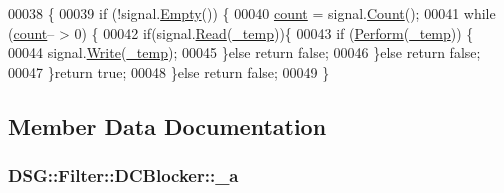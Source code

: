 \begin{DoxyCode}
00038                                                                     \{
00039             \textcolor{keywordflow}{if} (!signal.\hyperlink{class_d_s_g_1_1_ring_buffer_ac1346f5842d08b988a5297abe4089b96}{Empty}()) \{
00040                 \hyperlink{class_d_s_g_1_1_filter_1_1_d_c_blocker_a2a045707b5b79e7a4330c87156f7b344}{count} = signal.\hyperlink{class_d_s_g_1_1_ring_buffer_a9bd79b0a6dff618b205e396c101ee070}{Count}();
00041                 \textcolor{keywordflow}{while} (\hyperlink{class_d_s_g_1_1_filter_1_1_d_c_blocker_a2a045707b5b79e7a4330c87156f7b344}{count}-- > 0) \{
00042                     \textcolor{keywordflow}{if}(signal.\hyperlink{class_d_s_g_1_1_ring_buffer_a6b2848a64f15c7b0c320779582fa0fbe}{Read}(\hyperlink{class_d_s_g_1_1_filter_1_1_d_c_blocker_a4a698e11be27e8613f5b5146df9c4599}{\_temp}))\{
00043                         \textcolor{keywordflow}{if} (\hyperlink{class_d_s_g_1_1_filter_1_1_d_c_blocker_a9757794b5f9b7789132e5eaa44e07cef}{Perform}(\hyperlink{class_d_s_g_1_1_filter_1_1_d_c_blocker_a4a698e11be27e8613f5b5146df9c4599}{\_temp})) \{
00044                             signal.\hyperlink{class_d_s_g_1_1_ring_buffer_aa5dd2caa0a270173251faee40a43d692}{Write}(\hyperlink{class_d_s_g_1_1_filter_1_1_d_c_blocker_a4a698e11be27e8613f5b5146df9c4599}{\_temp});
00045                         \}\textcolor{keywordflow}{else} \textcolor{keywordflow}{return} \textcolor{keyword}{false};
00046                     \}\textcolor{keywordflow}{else} \textcolor{keywordflow}{return} \textcolor{keyword}{false};
00047                 \}\textcolor{keywordflow}{return} \textcolor{keyword}{true};
00048             \}\textcolor{keywordflow}{else} \textcolor{keywordflow}{return} \textcolor{keyword}{false};
00049         \}
\end{DoxyCode}


\subsection{Member Data Documentation}
\hypertarget{class_d_s_g_1_1_filter_1_1_d_c_blocker_ac048fff815764f3ad6d73b27553234c8}{
\subsubsection[{\+\_\+a}]{ D\+S\+G\+::\+Filter\+::\+D\+C\+Blocker\+::\+\_\+a\hspace{0.3cm}{\ttfamily [protected]}}}\label{class_d_s_g_1_1_filter_1_1_d_c_blocker_ac048fff815764f3ad6d73b27553234c8}


